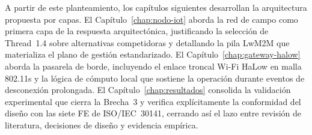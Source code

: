 A partir de este planteamiento, los capítulos siguientes desarrollan la arquitectura propuesta por capas. El Capítulo~\ref{chap:nodo-iot} aborda la red de campo como primera capa de la respuesta arquitectónica, justificando la selección de Thread~1.4 sobre alternativas competidoras y detallando la pila LwM2M que materializa el plano de gestión estandarizado. El Capítulo~\ref{chap:gateway-halow} aborda la pasarela de borde, incluyendo el enlace troncal Wi-Fi HaLow en malla 802.11s y la lógica de cómputo local que sostiene la operación durante eventos de desconexión prolongada. El Capítulo~\ref{chap:resultados} consolida la validación experimental que cierra la Brecha~3 y verifica explícitamente la conformidad del diseño con las siete FE de ISO/IEC~30141, cerrando así el lazo entre revisión de literatura, decisiones de diseño y evidencia empírica.
